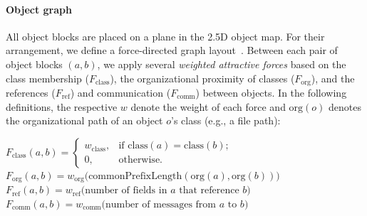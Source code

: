 \paragraph{Object graph}
\label{sec:visualization_approach/mapping/object_graph}

All object blocks are placed on a plane in the 2.5D object map.
For their arrangement, we define a force-directed graph layout~\cite{fruchterman1991graph}.
Between each pair of object blocks $(a, b)$, we apply several \emph{weighted attractive forces} based on the class membership ($F_\text{class}$), the organizational proximity of classes ($F_\text{org}$), and the references ($F_\text{ref}$) and communication ($F_\text{comm}$) between objects.
In the following definitions, the respective $w$ denote the weight of each force and $\text{org}(o)$ denotes the organizational path of an object $o$'s class (e.g., a file path):


\begin{algorithm}
	$F_{\text{class}}(a, b) = \begin{cases}w_{\text{class}}, & \text{if $\text{class}(a) = \text{class}(b)$;} \\ 0, & \text{otherwise}.\end{cases}$ \;
	$F_{\text{org}}(a, b) = w_{\text{org}}\bigl(\text{commonPrefixLength}(\text{org}(a), \text{org}(b))\bigr)$ \;
	$F_{\text{ref}}(a, b) = w_{\text{ref}}\bigl(\text{number of fields in $a$ that reference $b$}\bigr)$ \;
	$F_{\text{comm}}(a, b) = w_{\text{comm}}\bigl(\text{number of messages from $a$ to $b$}\bigr)$ \;
\end{algorithm}

